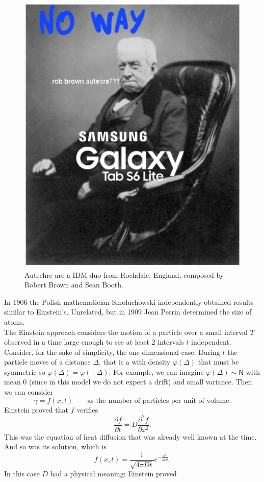 \documentclass{report}
\begin{document}
\begin{figure}[h]
	\centering
	\includegraphics[width=0.5\linewidth]{img/screenshot006}
	\caption{Autechre are a IDM duo from Rochdale, England, composed by Robert Brown and Sean Booth.}
	\label{fig:autecre}
\end{figure}
In 1906 the Polish mathematician Smoluchowski independently obtained results similar to Einstein's. Unrelated, but in 1909 Jean Perrin determined the size of atoms.\\
The Einstein approach considers the motion of a particle over a small interval $T$ observed in a time large enough to see at least 2 intervals $t$ independent. Consider, for the sake of simplicity, the one-dimensional case. During $t$ the particle moves of a distance $\Delta$, that is a \rv{} with density $\varphi(\Delta)$ that must be symmetric so $\varphi(\Delta)=\varphi(-\Delta)$. For example, we can imagine $\varphi(\Delta)\sim\mathsf{N}$ with mean 0 (since in this model we do not expect a drift) and small variance. Then we can consider
\begin{equation*}
	\gamma=f(x,t)\qquad\text{as the number of particles per unit of volume.}
\end{equation*}
Einstein proved that $f$ verifies
\begin{equation*}
	\frac{\partial f}{\partial t}=D\frac{\partial^{2}f}{\partial x^{2}}.
\end{equation*}
This was the equation of heat diffusion that was already well known at the time. And so was its solution, which is
\begin{equation*}
	f(x,t)=\frac{1}{\sqrt{4\pi Dt}}e^{-\frac{x^{2}}{4Dt}}.
\end{equation*}
In this case $D$ had a physical meaning: Einstein proved\par
\end{document}
